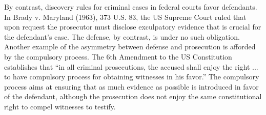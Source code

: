 \documentclass[10pt]{article}
\begin{document}
By contrast, discovery rules for criminal cases in federal courts favor defendants. In Brady v. Maryland (1963), 373 U.S. 83, 
the US Supreme Court ruled that upon request the prosecutor must 
disclose exculpatory evidence that is crucial for the defendant's case. 
The defense, by contrast, is under no such obligation.
%
%
Another example of the asymmetry between defense and prosecution is afforded by the compulsory process. 
The 6th Amendment to the US Constitution establishes that  ``in all criminal prosecutions, the accused shall enjoy the right ... to have compulsory process for obtaining witnesses in his favor.''  
%
The compulsory process aims at ensuring that as much evidence as possible is introduced in favor of the defendant, 
although the prosecution does not enjoy the same constitutional right to compel witnesses to testify.
\end{document}
